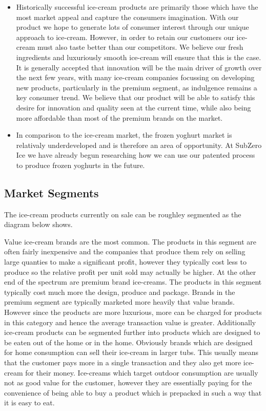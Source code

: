 \documentclass{article}
\begin{document}
\begin{itemize}
  \item Historically successful ice-cream products are primarily those which have the most market appeal and capture the consumers imagination. With our product we hope to generate lots of consumer interest through our unique approach to ice-cream. However, in order to retain our customers our ice-cream must also taste better than our competitors. We believe our fresh ingredients and luxuriously smooth ice-cream will ensure that this is the case. It is generally accepted that innovation will be the main driver of growth over the next few years, with many ice-cream companies focussing on developing new products, particularly in the premium segment, as indulgence remains a key consumer trend. We believe that our product will be able to satisfy this desire for innovation and quality seen at the current time, while also being more affordable than most of the premium brands on the market.

   \item In comparison to the ice-cream market, the frozen yoghurt market is relativaly underdeveloped and is therefore an area of opportunity. At SubZero Ice we have already begun researching how we can use our patented process to produce frozen yoghurts in the future.

  \end{itemize}


  \subsection{Market Segments}

  The ice-cream products currently on sale can be roughley segmented as the diagram below shows.

  Value ice-cream brands are the most common. The products in this segment are often fairly inexpensive and the companies that produce them rely on selling large quanties to make a significant profit, however they typically cost less to produce so the relative profit per unit sold may actually be higher. At the other end of the spectrum are premium brand ice-creams. The products in this segment typically cost much more the design, produce and package. Brands in the premium segment are typically marketed more heavily that value brands. However since the products are more luxurious, more can be charged for products in this category and hence the average transaction value is greater. Additionally ice-cream products can be segmented further into products which are designed to be eaten out of the home or in the home. Obviously brands which are designed for home consumption can sell their ice-cream in larger tubs. This usually means that the customer pays more in a single transaction and they also get more ice-cream for their money. Ice-creams which target outdoor consumption are usually not as good value for the customer, however they are essentially paying for the convenience of being able to buy a product which is prepacked in such a way that it is easy to eat.
\end{document}
